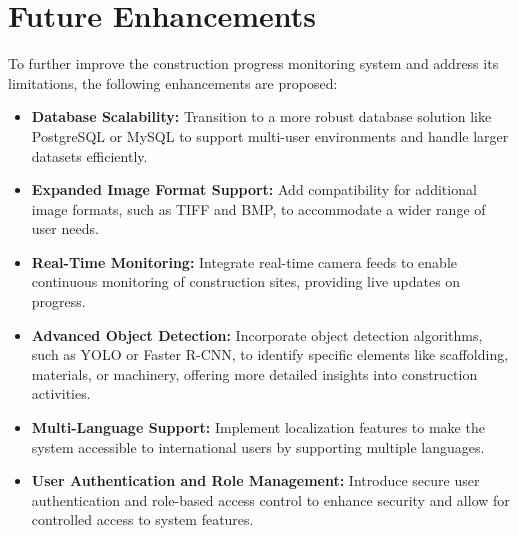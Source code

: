 \section{Future Enhancements}
To further improve the construction progress monitoring system and address its limitations, the following enhancements are proposed:
\begin{itemize}
    \item \textbf{Database Scalability:} Transition to a more robust database solution like PostgreSQL or MySQL to support multi-user environments and handle larger datasets efficiently.
    \item \textbf{Expanded Image Format Support:} Add compatibility for additional image formats, such as TIFF and BMP, to accommodate a wider range of user needs.
    \item \textbf{Real-Time Monitoring:} Integrate real-time camera feeds to enable continuous monitoring of construction sites, providing live updates on progress.
    \item \textbf{Advanced Object Detection:} Incorporate object detection algorithms, such as YOLO or Faster R-CNN, to identify specific elements like scaffolding, materials, or machinery, offering more detailed insights into construction activities.
    \item \textbf{Multi-Language Support:} Implement localization features to make the system accessible to international users by supporting multiple languages.
    \item \textbf{User Authentication and Role Management:} Introduce secure user authentication and role-based access control to enhance security and allow for controlled access to system features.
    
    
\end{itemize}


